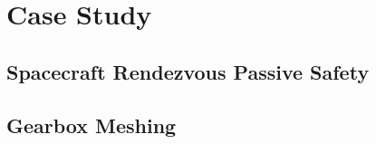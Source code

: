 \section{Case Study}
\label{sec:casestudy}

\subsection{Spacecraft Rendezvous Passive Safety}
\label{ssec:rendezvous}


\subsection{Gearbox Meshing}
\label{sec:gearbox}


